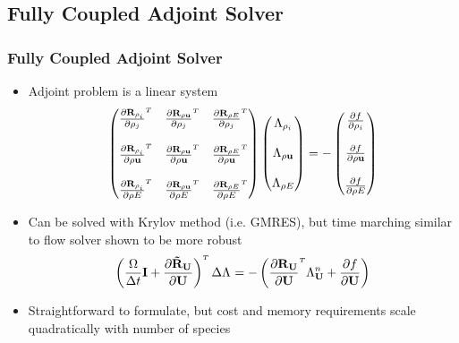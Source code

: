 \documentclass{beamer}
\begin{document}
\subsection{Fully Coupled Adjoint Solver}

\begin{frame}
  \frametitle{Fully Coupled Adjoint Solver}
  \begin{itemize}
    \item Adjoint problem is a linear system
      \begin{equation*}
        \begin{pmatrix}
          \rtdiff{\rho_i}{\rho_j} & 
          \rtdiff{\rho \vu}{\rho_j} & 
          \rtdiff{\rho E}{\rho_j} \\
          \\
          \rtdiff{\rho_i}{\rho \vu} & 
          \rtdiff{\rho \vu}{\rho \vu} & 
          \rtdiff{\rho E}{\rho \vu} \\
          \\
          \rtdiff{\rho_i}{\rho E} &
          \rtdiff{\rho \vu}{\rho E} &
          \rtdiff{\rho E}{\rho E}
        \end{pmatrix}
        \begin{pmatrix}
          \adjlam{\rho_i} \\ \\
          \adjlam{\rho \vu} \\ \\
          \adjlam{\rho E}
        \end{pmatrix}
        = -
        \begin{pmatrix}
          \pd{f}{\rho_i} \\ \\
          \pd{f}{\rho \vu} \\ \\
          \pd{f}{\rho E}
        \end{pmatrix}
      \end{equation*}
    \item Can be solved with Krylov method (i.e. GMRES), but time marching
      similar to flow solver shown to be more robust
      \begin{equation*}
        \left( \frac{\vol}{\Delta t} \mi + \druduapprox \right)^{\mathsmaller T}
        \Delta \adjlam{}
        = - \left( \rtdiff{\mU}{\mU} \adjlam{\mU}^{n} + \pd{f}{\mU} \right)
      \end{equation*}
    \item Straightforward to formulate, but cost and memory requirements
      scale quadratically with number of species
      
  \end{itemize}
\end{frame}
\end{document}
